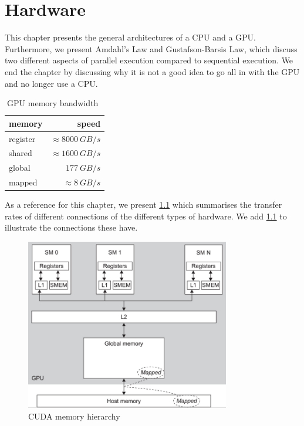 \chapter{Hardware}
\label{chap:hardware}

This chapter presents the general architectures of a CPU and a GPU.
Furthermore, we present Amdahl's Law and Gustafson-Barsis Law, which discuss two different aspects of parallel execution compared to sequential execution.
We end the chapter by discussing why it is not a good idea to go all in with the GPU and no longer use a CPU.

\begin{table}[htb]
  \centering
  \begin{tabular}{l r}
    \toprule
    memory & speed \\
    \midrule
    register & $\approx \SI{8000}{GB/s}$ \\
    shared   & $\approx \SI{1600}{GB/s}$ \\
    global   & $\SI{177}{GB/s}$ \\
    mapped   & $\approx \SI{8}{GB/s}$ \\
  \end{tabular}
  \caption{GPU memory bandwidth~\cite{farber2011cuda}}
  \label{tab:hardware connections transfer rates}
\end{table}

As a reference for this chapter, we present \cref{tab:hardware connections transfer rates} which summarises the transfer rates of different connections of the different types of hardware.
We add \cref{fig:cpu gpu communication} to illustrate the connections these have.

\begin{figure}[htb]
  \centering
  \includegraphics[height=7.5cm]{graphics/images/cuda-mem-hierarchy.png}
  \caption{CUDA memory hierarchy~\cite{farber2011cuda}}
  \label{fig:cpu gpu communication}
\end{figure}





